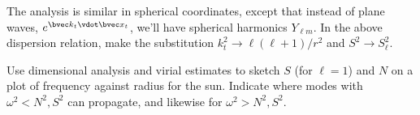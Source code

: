 The analysis is similar in spherical coordinates, except that instead of plane waves, $e^{\vkt\vdot\vx_{t}}$, we'll have spherical harmonics $Y_{\ell m}$.  In the above dispersion relation, make the substitution $k_{t}^{2} \to \ell(\ell + 1)/r^{2}$ and $S^{2} \to S^{2}_{\ell}$.

\begin{exercisebox}
Use dimensional analysis and virial estimates to sketch $S$ (for $\ell = 1$) and $N$ on a plot of frequency against radius for the sun. Indicate where modes with $\omega^{2} < N^{2}, S^{2}$ can propagate, and likewise for $\omega^{2} > N^{2}, S^{2}$.
\end{exercisebox}
